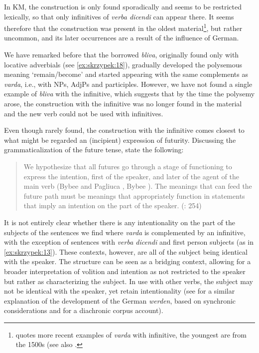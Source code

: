 \documentclass[output=paper,colorlinks,citecolor=brown]{langscibook}
\begin{document}
In KM, the construction is only found sporadically and seems to be restricted lexically, so that only infinitives of \textit{verba dicendi} can appear there. It seems therefore that the construction was present in the oldest material\footnote{\citeauthor{SAOB} quotes more recent examples of \textit{varda} with infinitive, the youngest are from the 1500s (see also .}, but rather uncommon, and its later occurrences are a result of the influence of German. 

We have remarked before that the borrowed \textit{bliva}, originally found only with locative adverbials (see \ref{ex:skrzypek:18}), gradually developed the polysemous meaning ‘remain/become’ and started appearing with the same complements as \textit{varda}, i.e., with NPs, AdjPs and participles. However, we have not found a single example of \textit{bliva} with the infinitive, which suggests that by the time the polysemy arose, the construction with the infinitive was no longer found in the material and the new verb could not be used with infinitives. 

Even though rarely found, the construction with the infinitive comes closest to what might be regarded an (incipient) expression of futurity. Discussing the grammaticalization of the future tense, \citet[]{BybeePerkinsPagliuca1994} state the following:

\begin{quote}
    We hypothesize that all futures go through a stage of functioning to express the intention, first of the speaker, and later of the agent of the main verb (Bybee and Pagliuca \citeyear{bybeeEvolutionFutureMeaning1987}, Bybee \citeyear{bybeeSemanticSubstanceVs1988}). The meanings that can feed the future path must be meanings that appropriately function in statements that imply an intention on the part of the speaker. (\cite{BybeePerkinsPagliuca1994}: 254)
\end{quote}

It is not entirely clear whether there is any intentionality on the part of the subjects of the sentences we find where \textit{varda} is complemented by an infinitive, with the exception of sentences with \textit{verba dicendi }and first person subjects (as in \ref{ex:skrzypek:13}). These contexts, however, are all of the subject being identical with the speaker. The structure can be seen as a bridging context, allowing for a broader interpretation of volition and intention as not restricted to the speaker but rather as characterizing the subject. In use with other verbs, the subject may not be identical with the speaker, yet retain intentionality (see \citet{Heine1995} for a similar explanation of the development of the German \textit{werden}, based on synchronic considerations and \citet{Hilpert2008} for a diachronic corpus account).
\end{document}
